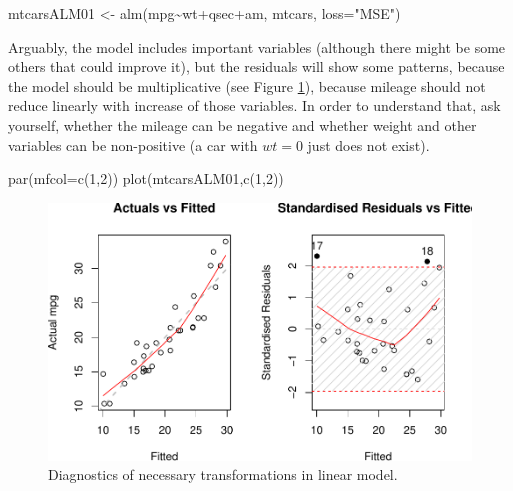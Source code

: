 \documentclass[
]{book}
\newenvironment{Shaded}{\begin{snugshade}}{\end{snugshade}}
\newcommand{\AttributeTok}[1]{\textcolor[rgb]{0.77,0.63,0.00}{#1}}
\newcommand{\DecValTok}[1]{\textcolor[rgb]{0.00,0.00,0.81}{#1}}
\newcommand{\FunctionTok}[1]{\textcolor[rgb]{0.00,0.00,0.00}{#1}}
\newcommand{\NormalTok}[1]{#1}
\newcommand{\OtherTok}[1]{\textcolor[rgb]{0.56,0.35,0.01}{#1}}
\newcommand{\SpecialCharTok}[1]{\textcolor[rgb]{0.00,0.00,0.00}{#1}}
\newcommand{\StringTok}[1]{\textcolor[rgb]{0.31,0.60,0.02}{#1}}
\theoremstyle{definition}
\theoremstyle{definition}
\theoremstyle{definition}
\theoremstyle{definition}
\theoremstyle{remark}
\begin{document}
\begin{Shaded}
\begin{Highlighting}[]
\NormalTok{mtcarsALM01 }\OtherTok{\textless{}{-}} \FunctionTok{alm}\NormalTok{(mpg}\SpecialCharTok{\textasciitilde{}}\NormalTok{wt}\SpecialCharTok{+}\NormalTok{qsec}\SpecialCharTok{+}\NormalTok{am, mtcars, }\AttributeTok{loss=}\StringTok{"MSE"}\NormalTok{)}
\end{Highlighting}
\end{Shaded}

Arguably, the model includes important variables (although there might be some others that could improve it), but the residuals will show some patterns, because the model should be multiplicative (see Figure \ref{fig:diagnostics03}), because mileage should not reduce linearly with increase of those variables. In order to understand that, ask yourself, whether the mileage can be negative and whether weight and other variables can be non-positive (a car with \(wt=0\) just does not exist).

\begin{Shaded}
\begin{Highlighting}[]
\FunctionTok{par}\NormalTok{(}\AttributeTok{mfcol=}\FunctionTok{c}\NormalTok{(}\DecValTok{1}\NormalTok{,}\DecValTok{2}\NormalTok{))}
\FunctionTok{plot}\NormalTok{(mtcarsALM01,}\FunctionTok{c}\NormalTok{(}\DecValTok{1}\NormalTok{,}\DecValTok{2}\NormalTok{))}
\end{Highlighting}
\end{Shaded}

\begin{figure}
\centering
\includegraphics{Svetunkov---Statistics-for-Business-Analytics_files/figure-latex/diagnostics03-1.pdf}
\caption{\label{fig:diagnostics03}Diagnostics of necessary transformations in linear model.}
\end{figure}
\end{document}
